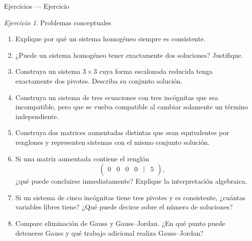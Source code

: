 \documentclass[aspectratio=169,11pt]{beamer}
\theoremstyle{remark}
\newtheorem{Ejer}[definicion]{Ejercicio}
\begin{document}
\begin{frame}[shrink=5]{Ejercicios — Ejercicio}
\footnotesize
\begin{Ejer} Problemas conceptuales

\begin{enumerate}[resume]

\item Explique por qué un sistema homogéneo siempre es consistente.

\item ¿Puede un sistema homogéneo tener exactamente dos soluciones? Justifique.

\item Construya un sistema $3\times3$ cuya forma escalonada reducida tenga exactamente
dos pivotes. Describa su conjunto solución.

\item Construya un sistema de tres ecuaciones con tres incógnitas que sea incompatible,
pero que se vuelva compatible al cambiar solamente un término independiente.

\item Construya dos matrices aumentadas distintas que sean equivalentes por renglones
y representen sistemas con el mismo conjunto solución.

\item Si una matriz aumentada contiene el renglón
\[
\begin{pmatrix}0&0&0&0&|&5\end{pmatrix},
\]
¿qué puede concluirse inmediatamente? Explique la interpretación algebraica.

\item Si un sistema de cinco incógnitas tiene tres pivotes y es consistente, ¿cuántas
variables libres tiene? ¿Qué puede decirse sobre el número de soluciones?

\item Compare eliminación de Gauss y Gauss--Jordan. ¿En qué punto puede detenerse
Gauss y qué trabajo adicional realiza Gauss--Jordan?

\end{enumerate}
\end{Ejer}
\end{frame}
\end{document}
